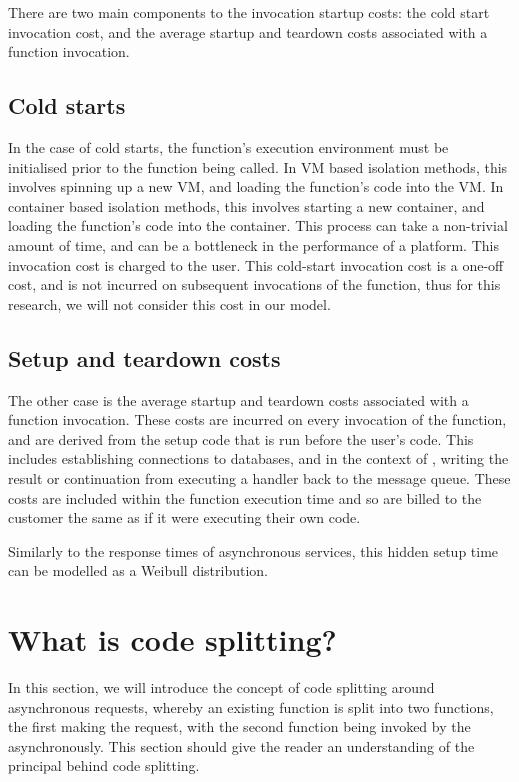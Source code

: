 There are two main components to the invocation startup costs: the cold start invocation cost, and the average startup and teardown costs associated with a function invocation.

\subsection{Cold starts}
In the case of cold starts, the function's execution environment must be initialised prior to the function being called. In VM based isolation methods, this involves spinning up a new VM, and loading the function's code into the VM. In container based isolation methods, this involves starting a new container, and loading the function's code into the container. This process can take a non-trivial amount of time, and can be a bottleneck in the performance of a \faas{} platform. This invocation cost is charged to the user. This cold-start invocation cost is a one-off cost, and is not incurred on subsequent invocations of the function, thus for this research, we will not consider this cost in our model.

\subsection{Setup and teardown costs}
The other case is the average startup and teardown costs associated with a function invocation. These costs are incurred on every invocation of the function, and are derived from the setup code that is run before the user's code. This includes establishing connections to databases, and in the context of \faaas{}, writing the result or continuation from executing a handler back to the message queue. These costs are included within the function execution time and so are billed to the customer the same as if it were executing their own code.

Similarly to the response times of asynchronous services, this hidden setup time can be modelled as a Weibull distribution.

\section{What is code splitting?}
\label{sec:faas-code-splitting}
In this section, we will introduce the concept of code splitting around asynchronous requests, whereby an existing function is split into two functions, the first making the request, with the second function being invoked by the  asynchronously. This section should give the reader an understanding of the principal behind code splitting.

